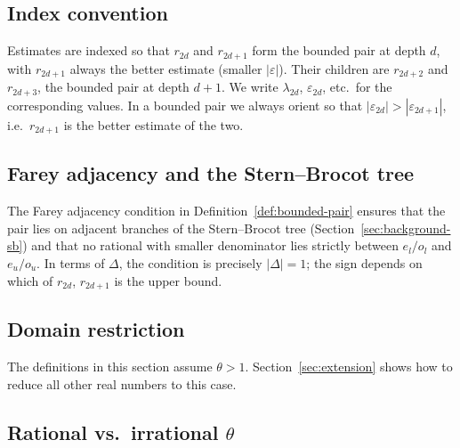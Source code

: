\documentclass[12pt]{article}
\theoremstyle{definition}
\theoremstyle{remark}
\theoremstyle{plain}
\newcommand{\lam}{\lambda}
\newcommand{\eps}{\varepsilon}
\newcommand{\Dval}{\Delta}
\begin{document}
\subsection*{Index convention}

Estimates are indexed so that $r_{2d}$ and $r_{2d+1}$ form the bounded pair at depth $d$,
with $r_{2d+1}$ always the better estimate (smaller $|\eps|$).
Their children are $r_{2d+2}$ and $r_{2d+3}$, the bounded pair at depth $d+1$.
We write $\lam_{2d}$, $\eps_{2d}$, etc.\ for the corresponding values.
In a bounded pair we always orient so that $|\eps_{2d}| > |\eps_{2d+1}|$, i.e.\ $r_{2d+1}$
is the better estimate of the two.

\subsection*{Farey adjacency and the Stern--Brocot tree}

The Farey adjacency condition in Definition~\ref{def:bounded-pair} ensures that the pair
lies on adjacent branches of the Stern--Brocot tree (Section~\ref{sec:background-sb}) and
that no rational with smaller denominator lies strictly between $e_l/o_l$ and $e_u/o_u$.
In terms of $\Dval$, the condition is precisely $|\Dval| = 1$;
the sign depends on which of $r_{2d}$, $r_{2d+1}$ is the upper bound.

\subsection*{Domain restriction}

The definitions in this section assume $\theta > 1$.
Section~\ref{sec:extension} shows how to reduce all other real numbers to this case.

\subsection*{Rational vs.\ irrational $\theta$}
\label{rem:rationality}
\end{document}

